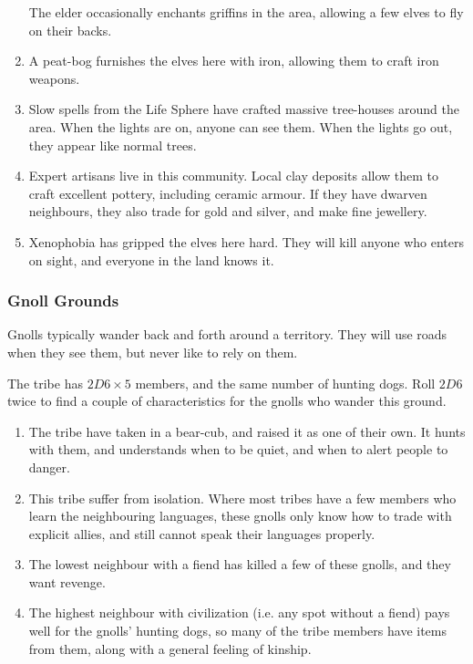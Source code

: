 \begin{multicols}{2}
\begin{enumerate}
  The elder occasionally enchants griffins in the area, allowing a few elves to fly on their backs.
  \item
  A peat-bog furnishes the elves here with iron, allowing them to craft iron weapons.
  \item
  Slow spells from the Life Sphere have crafted massive tree-houses around the area.
  When the lights are on, anyone can see them.
  When the lights go out, they appear like normal trees.
  \item
  Expert artisans live in this community.
  Local clay deposits allow them to craft excellent pottery, including ceramic armour.
  If they have dwarven neighbours, they also trade for gold and silver, and make fine jewellery.
  \item
  Xenophobia has gripped the elves here hard.
  They will kill anyone who enters on sight, and everyone in the land knows it.
\end{enumerate}

\subsubsection{Gnoll Grounds}
\label{gnollPoint}

Gnolls typically wander back and forth around a territory.
They will use roads when they see them, but never like to rely on them.

The tribe has $2D6 \times 5$ members, and the same number of hunting dogs.
Roll $2D6$ twice to find a couple of characteristics for the gnolls who wander this ground.

\begin{enumerate}
  \item
  The tribe have taken in a bear-cub, and raised it as one of their own.
  It hunts with them, and understands when to be quiet, and when to alert people to danger.
  \item
  This tribe suffer from isolation.
  Where most tribes have a few members who learn the neighbouring languages, these gnolls only know how to trade with explicit allies, and still cannot speak their languages properly.
  \item
  The lowest neighbour with a fiend has killed a few of these gnolls, and they want revenge.
  \item
  The highest neighbour with civilization (i.e. any spot without a fiend) pays well for the gnolls' hunting dogs, so many of the tribe members have items from them, along with a general feeling of kinship.


\end{enumerate}
\end{multicols}
